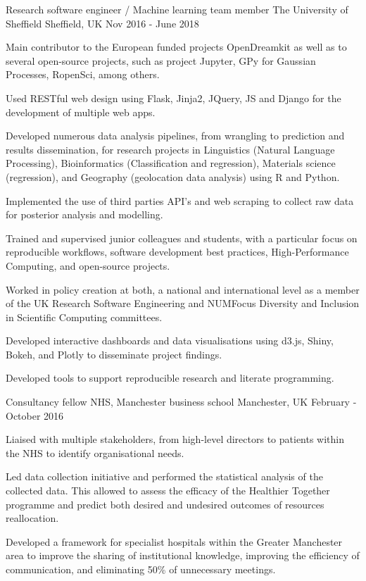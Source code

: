 \begin{cventries}

\cventry
{Research software engineer  / Machine learning team member } %
{The University of Sheffield } %
{Sheffield, UK} %
{Nov 2016 - June 2018 } %
{ %
\begin{cvitems}
\item {Main contributor to  the European funded projects OpenDreamkit as well as to several open-source projects, such as project Jupyter, GPy for Gaussian Processes, RopenSci, among others.}
\item {Used RESTful web design using Flask, Jinja2, JQuery, JS and Django for the development of multiple web apps.}
\item {Developed numerous data analysis pipelines, from wrangling to prediction and results dissemination, for research projects in Linguistics (Natural Language Processing), Bioinformatics (Classification and regression), Materials science (regression), and Geography (geolocation data analysis) using R and Python.}
\item { Implemented the use of third parties API's and web scraping to collect raw data for posterior analysis and modelling.}
\item {Trained and supervised junior colleagues and students, with a particular focus on reproducible workflows, software development best practices, High-Performance Computing, and open-source projects.}
\item {Worked in policy creation at both, a national and international level as a member of the UK Research Software Engineering and NUMFocus Diversity and Inclusion in Scientific Computing committees.}
\item {Developed interactive dashboards and data visualisations using d3.js, Shiny, Bokeh, and Plotly to disseminate project findings.}
\item{Developed tools to support reproducible research and literate programming.}
\end{cvitems}
}



\cventry
{Consultancy fellow}
{NHS, Manchester business school}
{Manchester, UK}
{February - October 2016}
{
\begin{cvitems}
\item {Liaised with multiple stakeholders, from high-level directors to patients within the NHS to identify organisational needs.}
\item  {Led data collection initiative and performed the statistical analysis of the collected data. This allowed to assess the efficacy of the Healthier Together programme and predict both desired and undesired outcomes of resources reallocation.}
\item{Developed a framework for specialist hospitals within the Greater Manchester area to improve the sharing of institutional knowledge, improving the efficiency of communication, and eliminating 50\% of unnecessary meetings.}
\end{cvitems}
}



\end{cventries}
